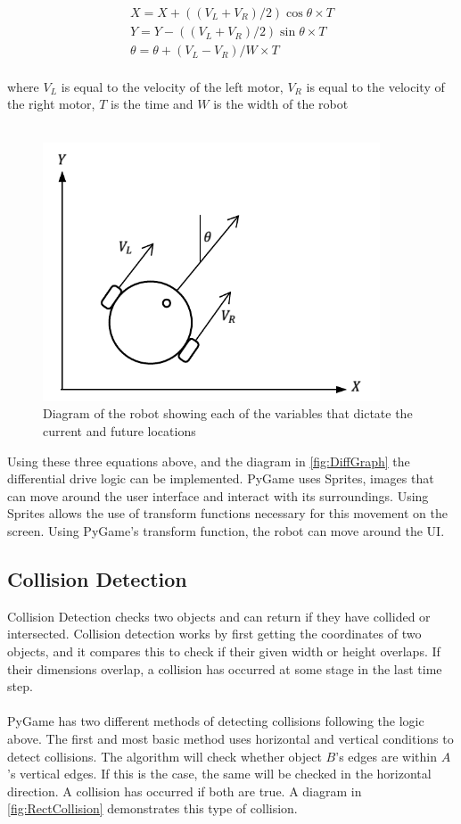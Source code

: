 \documentclass[a4paper,12pt]{article}
\begin{document}
\begin{equation}
\begin{aligned}
X = X+((V_L+V_R)/2) \cos\theta \times T \\
Y=Y-((V_L+V_R)/2) \sin\theta \times T \\
\theta=\theta+(V_L-V_R)/W \times T
\end{aligned}
\end{equation}\\
where $V_L$ is equal to the velocity of the left motor, $V_R$ is equal to the velocity of the right motor, $T$ is the time and $W$ is the width of the robot\\\\
\begin{figure}[H]
\centering
\includegraphics[width=10cm]{imgs/DiffGraph.png}
\centering
\caption{Diagram of the robot showing each of the variables that dictate the current and future locations}
\label{fig:DiffGraph}
\end{figure}

Using these three equations above, and the diagram in \autoref{fig:DiffGraph} the differential drive logic can be implemented. PyGame uses Sprites, images that can move around the user interface and interact with its surroundings. Using Sprites allows the use of transform functions necessary for this movement on the screen. Using PyGame's transform function, the robot can move around the UI.

\subsection{Collision Detection}
Collision Detection checks two objects and can return if they have collided or intersected. Collision detection works by first getting the coordinates of two objects, and it compares this to check if their given width or height overlaps. If their dimensions overlap, a collision has occurred at some stage in the last time step.
\\\\
PyGame has two different methods of detecting collisions following the logic above. The first and most basic method uses horizontal and vertical conditions to detect collisions. The algorithm will check whether object $B$'s edges are within $A$'s vertical edges. If this is the case, the same will be checked in the horizontal direction. A collision has occurred if both are true. A diagram in \autoref{fig:RectCollision} demonstrates this type of collision.
\end{document}
